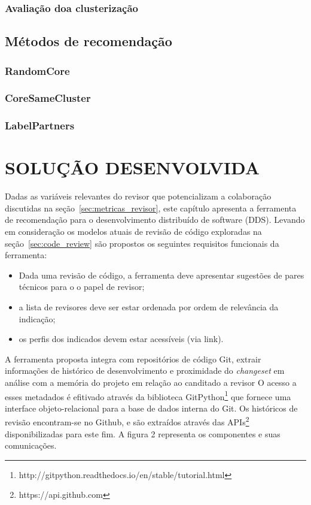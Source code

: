 \documentclass[12pt,openany,oneside,a4paper,english,brazil]{abntbibufjf}
\begin{document}
  \subsection{Avaliação doa clusterização}
\section{Métodos de recomendação}
  \subsection{RandomCore}
  \subsection{CoreSameCluster}
  \subsection{LabelPartners}


\chapter{SOLUÇÃO DESENVOLVIDA}\label{chap:solucao}
    Dadas as variáveis relevantes do revisor que potencializam a colaboração discutidas na seção~\ref{sec:metricas_revisor}, este capítulo apresenta a ferramenta de recomendação para o desenvolvimento distribuído de software (DDS). Levando em consideração os modelos atuais de revisão de código exploradas na seção~\ref{sec:code_review} são propostos os seguintes requisitos funcionais da ferramenta:
		\begin{itemize}
			\item Dada uma revisão de código, a ferramenta deve apresentar sugestões de pares técnicos para o o papel de revisor;
			\item a lista de revisores deve ser estar ordenada por ordem de relevância da indicação;
			\item os perfis dos indicados devem estar acessíveis (via link).
		\end{itemize}

		A ferramenta proposta integra com repositórios de código Git, extrair informações de histórico de desenvolvimento e proximidade do \textit{changeset} em análise com a memória do projeto em relação ao canditado a revisor O acesso a esses metadados é efitivado através da biblioteca GitPython\footnote{http://gitpython.readthedocs.io/en/stable/tutorial.html} que fornece uma interface objeto-relacional para a base de dados interna do Git. Os históricos de revisão encontram-se no Github, e são extraídos através das APIs\footnote{https://api.github.com} disponibilizadas para este fim. A figura 2 representa os componentes e suas comunicações.
\end{document}
